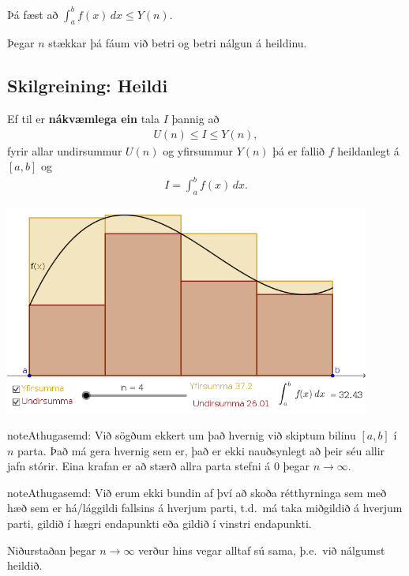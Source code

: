 \documentclass[b5paper,11pt,icelandic]{sphinxmanual}
\begin{document}
Þá fæst að \(\int_a^b f(x)\, dx \leq Y(n)\).

Þegar \(n\) stækkar þá fáum við betri og betri nálgun á heildinu.


\subsection{Skilgreining: Heildi}
\label{kafli06:skilgreining-heildi}
Ef til er \textbf{nákvæmlega ein} tala \(I\) þannig að
\begin{equation*}
\begin{split}U(n) \leq I \leq Y(n),\end{split}
\end{equation*}
fyrir allar undirsummur \(U(n)\) og yfirsummur \(Y(n)\) þá er
fallið \(f\) heildanlegt á \([a,b]\) og
\begin{equation*}
\begin{split}I = \int_a^b f(x)\, dx.\end{split}
\end{equation*}

\begin{center}
\includegraphics[width=12cm,keepaspectratio=true]{./03_undirogyfirsumma.png}
\end{center}


\begin{notice}{note}{Athugasemd:}
Við sögðum ekkert um það hvernig við skiptum bilinu \([a,b]\) í
\(n\) parta. Það má gera hvernig sem er, það er ekki nauðsynlegt að
þeir séu allir jafn stórir. Eina krafan er að stærð allra parta stefni á
0 þegar \(n\to \infty\).
\end{notice}

\begin{notice}{note}{Athugasemd:}
Við erum ekki bundin af því að skoða rétthyrninga sem með hæð sem er
há/lággildi fallsins á hverjum parti, t.d. má taka miðgildið á hverjum
parti, gildið í hægri endapunkti eða gildið í vinstri endapunkti.

Niðurstaðan þegar \(n\to \infty\) verður hins vegar alltaf sú sama,
þ.e. við nálgumst heildið.
\end{notice}
\end{document}

